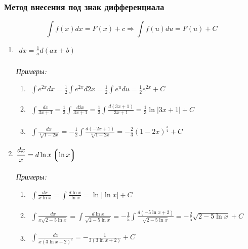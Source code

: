 \documentclass[12pt, fleqn]{book}
\begin{document}
	\subsubsection{Метод внесения под знак дифференциала}
	\begin{equation*}
		\int f(x)dx=F(x)+c \Rightarrow \int f(u)du=F(u)+C
	\end{equation*}
	\begin{enumerate}[1.]
		\item $\begin{gathered}
			dx=\frac{1}{a}d\left(ax+b\right)
		\end{gathered}$\\\\
		\textit{Примеры:}
		\begin{enumerate}[1)]
			\item $\begin{gathered}
				\int e^{2x}dx=\frac{1}{2}\int e^{2x}d2x=\frac{1}{2}\int e^udu=\frac{1}{2}e^{2x}+C
			\end{gathered}$
			\item $\begin{gathered}
				\int \frac{dx}{3x+1}=\frac{1}{3}\int \frac{d3x}{3x+1}=\frac{1}{3}\int \frac{d(3x+1)}{3x+1}=\frac{1}{3}\ln\left|3x+1 \right|+C
			\end{gathered}$
			\item $\begin{gathered}
				\int \frac{dx}{\sqrt[4]{1-2x}}=-\frac{1}{2}\int \frac{d(-2x+1)}{\sqrt[4]{1-2x}}=-\frac{2}{3}\left(1-2x\right)^\frac{3}{4}+C
			\end{gathered}$
		\end{enumerate}
		\item $\begin{gathered}
			\frac{dx}{x}=d\ln x \left\lgroup \ln x \right\rgroup
		\end{gathered}$\\\\
		\textit{Примеры:}
		\begin{enumerate}[1)]
			\item $\begin{gathered}
				\int \frac{dx}{x \ln x}=\int \frac{d \ln x}{\ln x}=\ln\left| \ln x\right| + C
			\end{gathered}$
			\item $\begin{gathered}
				\int \frac{dx}{x\sqrt{2-5\ln x}}=\int \frac{d\ln x}{\sqrt{2-5\ln x}}=-\frac{1}{5}\int \frac{d\left(-5\ln x+2\right)}{\sqrt{2-5\ln x}}=-\frac{2}{5}\sqrt{2-5\ln x} +C
			\end{gathered}$
			\item $\begin{gathered}
				\int \frac{dx}{x\left(3\ln x + 2\right)^2}=-\frac{1}{3\left(3\ln x + 2\right)} + C
			\end{gathered}$
		\end{enumerate}
	\end{enumerate}
\end{document}
